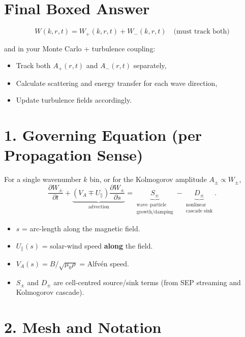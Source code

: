 \hrulefill

\section*{\texorpdfstring{ \textbf{Final Boxed Answer}}{}}

\[
\boxed{
W(k, r, t) = W_+(k, r, t) + W_-(k, r, t) \quad \text{(must track both)}
}
\]

and in your Monte Carlo + turbulence coupling:
\begin{itemize}
    \item Track both $A_+(r, t)$ and $A_-(r, t)$ separately,
    \item Calculate scattering and energy transfer for each wave direction,
    \item Update turbulence fields accordingly.
\end{itemize}

\section*{1. Governing Equation (per Propagation Sense)}

For a single wavenumber $k$ bin, or for the Kolmogorov amplitude $A_\pm \propto W_\pm$,
\begin{equation}
\boxed{
\frac{\partial W_\pm}{\partial t}
+ \underbrace{(V_A \mp U_\parallel) \frac{\partial W_\pm}{\partial s}}_{\text{advection}}
= \underbrace{S_\pm}_{\substack{\text{wave–particle} \\ \text{growth/damping}}}
- \underbrace{D_\pm}_{\substack{\text{nonlinear} \\ \text{cascade sink}}}.
}
\tag{1}
\end{equation}

\begin{itemize}
    \item $s$ = arc-length along the magnetic field.
    \item $U_\parallel(s)$ = solar-wind speed \textbf{along} the field.
    \item $V_A(s) = B / \sqrt{\mu_0 \rho}$ = Alfvén speed.
    \item $S_\pm$ and $D_\pm$ are cell-centred source/sink terms (from SEP streaming and Kolmogorov cascade).
\end{itemize}

\hrulefill

\section*{2. Mesh and Notation}


